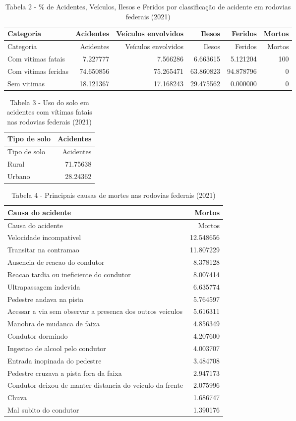 \documentclass[
]{article}
\begin{document}
\begin{longtable}[]{@{}lrrrrr@{}}
\caption{Tabela 2 - \% de Acidentes, Veículos, Ilesos e Feridos por
classificação de acidente em rodovias federais (2021)}\tabularnewline
\toprule
Categoria & Acidentes & Veículos envolvidos & Ilesos & Feridos &
Mortos \\
\midrule
\endfirsthead
\toprule
Categoria & Acidentes & Veículos envolvidos & Ilesos & Feridos &
Mortos \\
\midrule
\endhead
Com vitimas fatais & 7.227777 & 7.566286 & 6.663615 & 5.121204 & 100 \\
Com vitimas feridas & 74.650856 & 75.265471 & 63.860823 & 94.878796 &
0 \\
Sem vitimas & 18.121367 & 17.168243 & 29.475562 & 0.000000 & 0 \\
\bottomrule
\end{longtable}

\begin{longtable}[]{@{}lr@{}}
\caption{Tabela 3 - Uso do solo em acidentes com vítimas fatais nas
rodovias federais (2021)}\tabularnewline
\toprule
Tipo de solo & Acidentes \\
\midrule
\endfirsthead
\toprule
Tipo de solo & Acidentes \\
\midrule
\endhead
Rural & 71.75638 \\
Urbano & 28.24362 \\
\bottomrule
\end{longtable}

\begin{longtable}[]{@{}lr@{}}
\caption{Tabela 4 - Principais causas de mortes nas rodovias federais
(2021)}\tabularnewline
\toprule
Causa do acidente & Mortos \\
\midrule
\endfirsthead
\toprule
Causa do acidente & Mortos \\
\midrule
\endhead
Velocidade incompativel & 12.548656 \\
Transitar na contramao & 11.807229 \\
Ausencia de reacao do condutor & 8.378128 \\
Reacao tardia ou ineficiente do condutor & 8.007414 \\
Ultrapassagem indevida & 6.635774 \\
Pedestre andava na pista & 5.764597 \\
Acessar a via sem observar a presenca dos outros veiculos & 5.616311 \\
Manobra de mudanca de faixa & 4.856349 \\
Condutor dormindo & 4.207600 \\
Ingestao de alcool pelo condutor & 4.003707 \\
Entrada inopinada do pedestre & 3.484708 \\
Pedestre cruzava a pista fora da faixa & 2.947173 \\
Condutor deixou de manter distancia do veiculo da frente & 2.075996 \\
Chuva & 1.686747 \\
Mal subito do condutor & 1.390176 \\
\bottomrule
\end{longtable}
\end{document}
